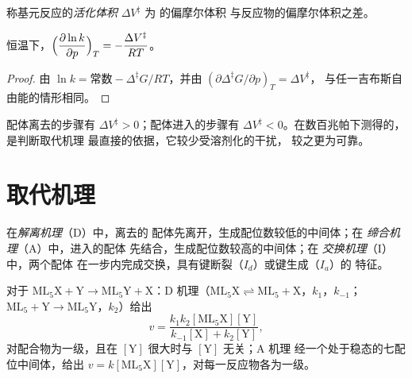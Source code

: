 \begin{definition}[活化体积]\label{def:b3:complex-mechanisms:activation-volume}
称基元反应的\emph{活化体积} $\Delta V^{\ddagger}$ 为
的偏摩尔体积
与反应物的偏摩尔体积之差。
\end{definition}

\begin{proposition}[速率常数的压强依赖性]\label{prop:b3:complex-mechanisms:pressure}
恒温下，$\displaystyle\Bigl(\frac{\partial\ln k}{\partial p}\Bigr)_T = -\frac{\Delta V^{\ddagger}}{RT}$。
\end{proposition}

\begin{proof}
由 $\ln k = \text{常数} - \Delta^{\ddagger}G/RT$，并由 $(\partial\Delta^{\ddagger}G/\partial p)_T = \Delta V^{\ddagger}$，
与任一吉布斯自由能的情形相同。
\end{proof}

配体离去的步骤有 $\Delta V^{\ddagger} > 0$；配体进入的步骤有 $\Delta V^{\ddagger}
< 0$。在数百兆帕下测得的，是判断取代机理
最直接的依据，它较少受溶剂化的干扰，
较之更为可靠。

\section{取代机理}

\begin{definition}\label{def:b3:complex-mechanisms:mechanisms}
在\emph{解离机理}（D）中，离去的
配体先离开，生成配位数较低的中间体；在
\emph{缔合机理}（A）中，进入的配体
先结合，生成配位数较高的中间体；在
\emph{交换机理}（I）中，两个配体
在一步内完成交换，具有键断裂（$I_d$）或键生成（$I_a$）的
特征。
\end{definition}

\begin{proposition}\label{prop:b3:complex-mechanisms:d-a-laws}
对于 $\mathrm{ML_5X + Y \to ML_5Y + X}$：D 机理（$\mathrm{ML_5X} \rightleftharpoons \mathrm{ML_5} + \mathrm X$，$k_1$，$k_{-1}$；$\mathrm{ML_5} + \mathrm Y
\to \mathrm{ML_5Y}$，$k_2$）给出
\[
  v = \frac{k_1k_2[\mathrm{ML_5X}][\mathrm Y]}{k_{-1}[\mathrm X] + k_2[\mathrm Y]},
\]
对配合物为一级，且在 $[\mathrm Y]$ 很大时与 $[\mathrm Y]$ 无关；A 机理
经一个处于稳态的七配位中间体，给出 $v =
k[\mathrm{ML_5X}][\mathrm Y]$，对每一反应物各为一级。
\end{proposition}


